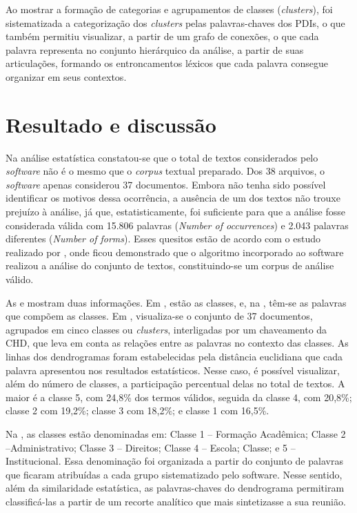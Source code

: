 \documentclass[portuguese]{textolivre}
\begin{document}
Ao mostrar a formação de categorias e agrupamentos de classes (\textit{clusters}), foi sistematizada a categorização dos \textit{clusters} pelas palavras-chaves dos PDIs, o que também permitiu visualizar, a partir de um grafo de conexões, o que cada palavra representa no conjunto hierárquico da análise, a partir de suas articulações, formando os entroncamentos léxicos que cada palavra consegue organizar em seus contextos.

\section{Resultado e discussão}
Na análise estatística constatou-se que o total de textos considerados pelo \textit{software} não é o mesmo que o \textit{corpus} textual preparado. Dos 38 arquivos, o \textit{software} apenas considerou 37 documentos. Embora não tenha sido possível identificar os motivos dessa ocorrência, a ausência de um dos textos não trouxe prejuízo à análise, já que, estatisticamente, foi suficiente para que a análise fosse considerada válida com 15.806 palavras (\textit{Number of occurrences}) e 2.043 palavras diferentes (\textit{Number of forms}). Esses quesitos estão de acordo com o estudo realizado por \textcite{silva_o_2021}, onde ficou demonstrado que o algoritmo incorporado ao software realizou a análise do conjunto de textos, constituindo-se um corpus de análise válido.

As  e  mostram duas informações. Em , estão as classes, e, na , têm-se as palavras que compõem as classes. Em , visualiza-se o conjunto de 37 documentos, agrupados em cinco classes ou \textit{clusters}, interligadas por um chaveamento da CHD, que leva em conta as relações entre as palavras no contexto das classes. As linhas dos dendrogramas foram estabelecidas pela distância euclidiana que cada palavra apresentou nos resultados estatísticos. Nesse caso, é possível visualizar, além do número de classes, a participação percentual delas no total de textos. A maior é a classe 5, com 24,8\% dos termos válidos, seguida da classe 4, com 20,8\%; classe 2 com 19,2\%; classe 3 com 18,2\%; e classe 1 com 16,5\%.

Na , as classes estão denominadas em: Classe 1 – Formação Acadêmica; Classe 2 –Administrativo; Classe 3 – Direitos; Classe 4 – Escola; Classe; e 5 – Institucional. Essa denominação foi organizada a partir do conjunto de palavras que ficaram atribuídas a cada grupo sistematizado pelo software. Nesse sentido, além da similaridade estatística, as palavras-chaves do dendrograma permitiram classificá-las a partir de um recorte analítico que mais sintetizasse a sua reunião.
\end{document}
